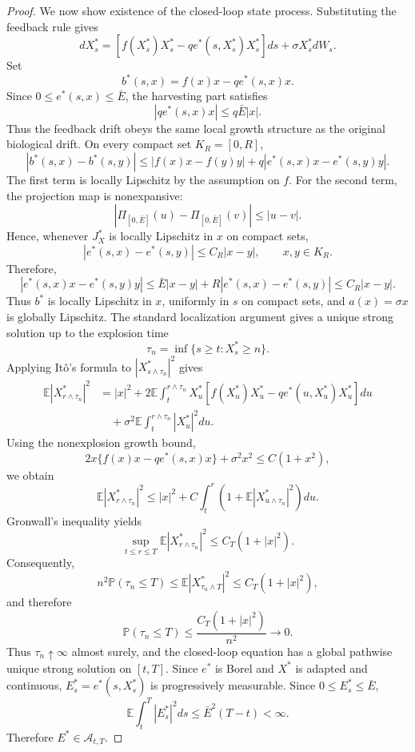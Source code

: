 \documentclass[10pt,a4paper]{amsart}
\begin{document}
\begin{proof}
		We now show existence of the closed-loop state process. Substituting the feedback rule gives
		\[
		dX_s^*
		=
		\left[
		f(X_s^*)X_s^*
		-
		qe^*(s,X_s^*)X_s^*
		\right]ds
		+
		\sigma X_s^*dW_s.
		\]
		Set
		\[
		b^*(s,x)
		=
		f(x)x-qe^*(s,x)x.
		\]
		Since $0\le e^*(s,x)\le\bar E$, the harvesting part satisfies
		\[
		|qe^*(s,x)x|
		\le q\bar E |x|.
		\]
		Thus the feedback drift obeys the same local growth structure as the original biological drift. On every compact set $K_R=[0,R]$,
		\[
		|b^*(s,x)-b^*(s,y)|
		\le
		|f(x)x-f(y)y|
		+
		q|e^*(s,x)x-e^*(s,y)y|.
		\]
		The first term is locally Lipschitz by the assumption on $f$. For the second term, the projection map is nonexpansive:
		\[
		|\Pi_{[0,\bar E]}(u)-\Pi_{[0,\bar E]}(v)|
		\le |u-v|.
		\]
		Hence, whenever $J_X^*$ is locally Lipschitz in $x$ on compact sets,
		\[
		|e^*(s,x)-e^*(s,y)|
		\le
		C_R|x-y|,
		\qquad x,y\in K_R.
		\]
		Therefore,
		\[
		|e^*(s,x)x-e^*(s,y)y|
		\le
		\bar E|x-y|+R|e^*(s,x)-e^*(s,y)|
		\le
		C_R|x-y|.
		\]
		Thus $b^*$ is locally Lipschitz in $x$, uniformly in $s$ on compact sets, and $a(x)=\sigma x$ is globally Lipschitz. The standard localization argument gives a unique strong solution up to the explosion time
		\[
		\tau_n=\inf\{s\ge t:X_s^*\ge n\}.
		\]
		Applying It\^o's formula to $|X_{s\wedge\tau_n}^*|^2$ gives
		\[
		\begin{aligned}
			\mathbb{E}|X_{r\wedge\tau_n}^*|^2
			&=
			|x|^2
			+
			2\mathbb{E}\int_t^{r\wedge\tau_n}
			X_u^*
			\left[
			f(X_u^*)X_u^*
			-
			qe^*(u,X_u^*)X_u^*
			\right]du  \\
			&\quad
			+
			\sigma^2
			\mathbb{E}\int_t^{r\wedge\tau_n}
			|X_u^*|^2du .
		\end{aligned}
		\]
		Using the nonexplosion growth bound,
		\[
		2x\{f(x)x-qe^*(s,x)x\}+\sigma^2x^2
		\le
		C(1+x^2),
		\]
		we obtain
		\[
		\mathbb{E}|X_{r\wedge\tau_n}^*|^2
		\le
		|x|^2
		+
		C\int_t^r
		\left(
		1+
		\mathbb{E}|X_{u\wedge\tau_n}^*|^2
		\right)du.
		\]
		Gronwall's inequality yields
		\[
		\sup_{t\le r\le T}
		\mathbb{E}|X_{r\wedge\tau_n}^*|^2
		\le
		C_T(1+|x|^2).
		\]
		Consequently,
		\[
		n^2\mathbb{P}(\tau_n\le T)
		\le
		\mathbb{E}|X_{\tau_n\wedge T}^*|^2
		\le
		C_T(1+|x|^2),
		\]
		and therefore
		\[
		\mathbb{P}(\tau_n\le T)\le \frac{C_T(1+|x|^2)}{n^2}\to0.
		\]
		Thus $\tau_n\uparrow\infty$ almost surely, and the closed-loop equation has a global pathwise unique strong solution on $[t,T]$. Since $e^*$ is Borel and $X^*$ is adapted and continuous, $E_s^*=e^*(s,X_s^*)$ is progressively measurable. Since $0\le E_s^*\le\bar E$,
		\[
		\mathbb{E}\int_t^T |E_s^*|^2ds
		\le
		\bar E^2(T-t)<\infty.
		\]
		Therefore $E^*\in\mathcal{A}_{t,T}$.
		

\end{proof}
\end{document}

